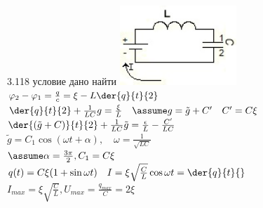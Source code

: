 \testCom
{%
	3.118
}
{%
	условие
}
{%
	дано
}
{%
	найти
}
{%
	\includegraphics[height=30mm]{3_118.jpg}\\
	$\varphi_2 - \varphi_1 = \frac{q}{c} = \xi - L \der{q}{t}{2}$\\
	$\der{q}{t}{2} + \frac{1}{LC} g = \frac{\xi}{L} \quad \assume g = \tilde g + C' \quad C' = C\xi$\\
	$\der{(\tilde g + C)}{t}{2} + \frac{1}{LC} \tilde g = \frac{\epsilon}{L} - \frac{C'}{LC}$\\
	$\tilde g = C_1 \cos (\omega t + \alpha), \quad \omega = \frac{1}{\sqrt{LC}}$\\
	$\assume \alpha = \frac{3 \pi}{2}, C_1 = C \xi$\\
	$q(t) = C \xi (1 + \sin \omega t) \quad I = \xi \sqrt{\frac{C}{L}} \cos \omega t = \der{q}{t}{}$\\
	$I_{max} = \xi \sqrt{\frac{C}{L}}, U_{max} = \frac{q_{max}}{C} = 2 \xi$\\
}

